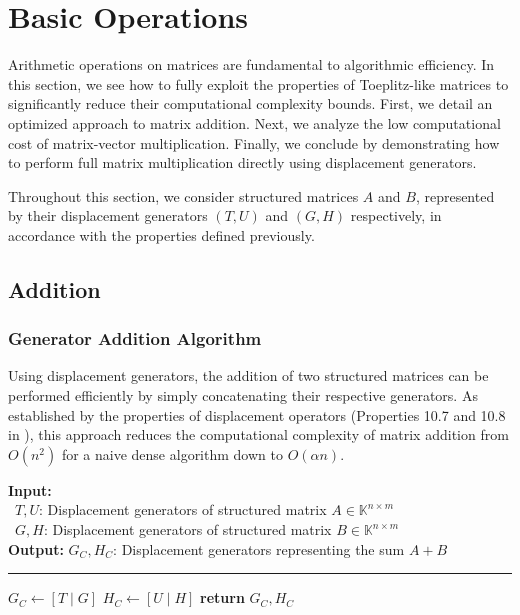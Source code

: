 \section{Basic Operations}
\label{ch:operations}

Arithmetic operations on matrices are fundamental to algorithmic
efficiency. In this section, we see how to fully exploit the
properties of Toeplitz-like matrices to significantly reduce their
computational complexity bounds. First, we detail an optimized
approach to matrix addition. Next, we analyze the low computational
cost of matrix-vector multiplication. Finally, we conclude by
demonstrating how to perform full matrix multiplication directly
using displacement generators.

Throughout this section, we consider structured matrices $A$ and $B$,
represented by their displacement generators $(T, U)$ and $(G, H)$
respectively, in accordance with the properties defined previously.

\subsection{Addition}

\subsubsection{Generator Addition Algorithm}

Using displacement generators, the addition of two structured
matrices can be performed efficiently by simply concatenating their
respective generators. As established by the properties of
displacement operators (Properties 10.7 and 10.8 in
\cite{aecf-2017-pdf}), this approach reduces the computational
complexity of matrix addition from $O(n^2)$ for a naive
dense algorithm down to $O(\alpha n)$.

\begin{algorithm}[H]
  \caption{Generator Addition}

  \textbf{Input:} \\
  \hspace*{0.5cm} \textbullet \ $T, U$: Displacement generators of
  structured matrix $A \in \mathbb{K}^{n \times m}$ \\
  \hspace*{0.5cm} \textbullet \ $G, H$: Displacement generators of
  structured matrix $B \in \mathbb{K}^{n \times m}$ \\
  \textbf{Output:} $G_C, H_C$: Displacement generators representing
  the sum $A + B$

  \vspace{0.15cm}
  \hrule
  \vspace{0.15cm}

  \begin{algorithmic}[1]
    \State $G_C \gets [T \mid G]$ 
    \State $H_C \gets [U \mid H]$ 
    \State \textbf{return} $G_C, H_C$
    \EndFunction
  \end{algorithmic}
\end{algorithm}

